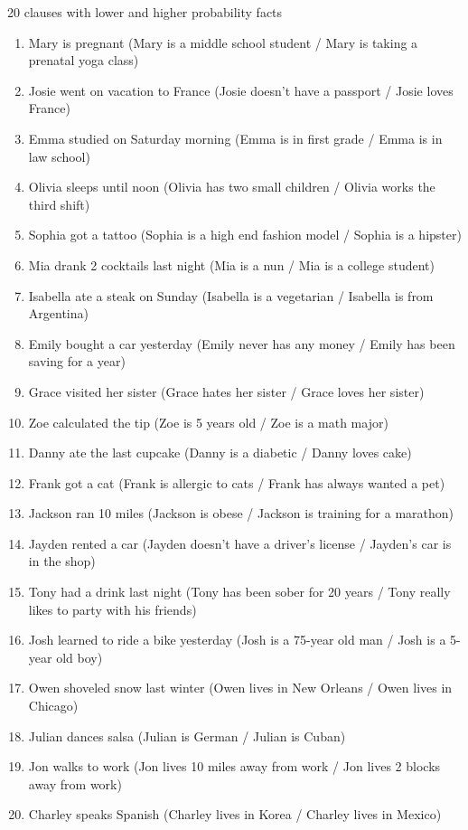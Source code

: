 \documentclass[11pt,fleqn]{article}
\newcommand{\6}{\mbox{$[\hspace*{-.6mm}[$}}
\newcommand{\9}{\mbox{$]\hspace*{-.6mm}]$}}
\begin{document}
\begin{exe}
\ex\label{clauses} 20 clauses with lower and higher probability facts
\begin{enumerate}[leftmargin=2ex,itemsep=-1.5pt]
\item Mary is pregnant (Mary is a middle school student / Mary is taking a prenatal yoga class)
\item Josie went on vacation to France (Josie doesn't have a passport / Josie loves France)
\item Emma studied on Saturday morning (Emma is in first grade / Emma is in law school)
\item Olivia sleeps until noon (Olivia has two small children / Olivia works the third shift)
\item Sophia got a tattoo (Sophia is a high end fashion model / Sophia is a hipster)
\item Mia drank 2 cocktails last night (Mia is a nun / Mia is a college student)
\item Isabella ate a steak on Sunday (Isabella is a vegetarian / Isabella is from Argentina)
\item Emily bought a car yesterday (Emily never has any money / Emily has been saving for a year)
\item Grace visited her sister (Grace hates her sister / Grace loves her sister)
\item Zoe calculated the tip (Zoe is 5 years old / Zoe is a math major)
\item Danny ate the last cupcake (Danny is a diabetic / Danny loves cake)
\item Frank got a cat (Frank is allergic to cats / Frank has always wanted a pet)
\item Jackson ran 10 miles (Jackson is obese / Jackson is training for a marathon)
\item Jayden rented a car (Jayden doesn't have a driver's license / Jayden's car is in the shop)
\item Tony had a drink last night (Tony has been sober for 20 years / Tony really likes to party with his friends)
\item Josh learned to ride a bike yesterday (Josh is a 75-year old man / Josh is a 5-year old boy)
\item Owen shoveled snow last winter (Owen lives in New Orleans / Owen lives in Chicago)
\item Julian dances salsa (Julian is German / Julian is Cuban)
\item Jon walks to work (Jon lives 10 miles away from work / Jon lives 2 blocks away from work)
\item Charley speaks Spanish (Charley lives in Korea / Charley lives in Mexico)
\end{enumerate}
\end{exe}
\end{document}
